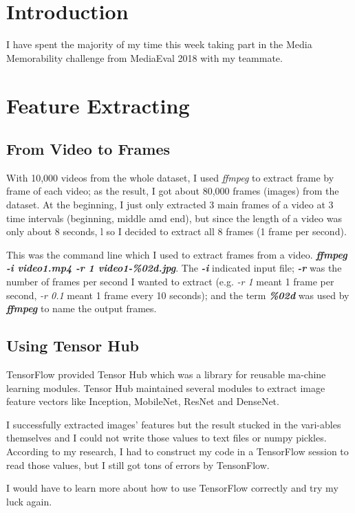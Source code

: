 \section{Introduction}
I have spent the majority of my time this week taking part in the Media Memorability challenge from MediaEval 2018 with my teammate.

\section{Feature Extracting}
\subsection{From Video to Frames}
With 10,000 videos from the whole dataset, I used \emph{ffmpeg} to extract frame by frame of each video; as the result, I got about 80,000 frames (images) from the dataset. At the beginning, I just only extracted 3 main frames of a video at 3 time intervals (beginning, middle amd end),  but since the length of a video was only about 8 seconds, l so I decided to extract all 8 frames (1 frame per second).

This was the command line which I used to extract frames from a video. \textbf{\emph{ffmpeg -i video1.mp4 -r 1 video1-\%02d.jpg}}. The \textbf{\emph{-i}} indicated input file; \textbf{\emph{-r}} was the number of frames per second I wanted to extract (e.g. \emph{-r 1} meant 1 frame per second,  \emph{-r 0.1} meant 1 frame every 10 seconds); and the term \textbf{\emph{\%02d}} was used by \textbf{\emph{ffmpeg}} to name the output frames.

\subsection{Using Tensor Hub}
TensorFlow\cite{tensorflow} provided Tensor Hub which was a library for reusable ma-chine learning modules. Tensor Hub maintained several modules to extract image feature vectors like Inception, MobileNet, ResNet and DenseNet.

I successfully extracted images' features but the result stucked in the vari-ables themselves and I could not write those values to text files or numpy pickles. According to my research, I had to construct my code in a TensorFlow session to read those values, but I still got tons of errors by TensonFlow.

I would have to learn more about how to use TensorFlow correctly and try my luck again.

